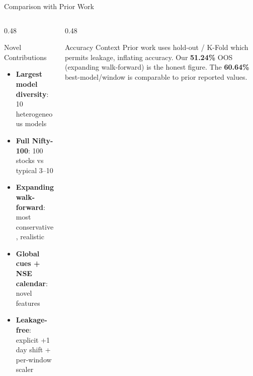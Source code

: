 \documentclass[aspectratio=43,11pt]{beamer}
\begin{document}
\begin{frame}[shrink=10]{Comparison with Prior Work}
    \begin{center}
    \end{center}
    \vspace{0.05cm}
    \begin{columns}[T]
        \begin{column}{0.48\textwidth}
            \begin{exampleblock}{Novel Contributions}
                \footnotesize\setlength{\itemsep}{2pt}
                \begin{itemize}
                    \item \textbf{Largest model diversity}: 10 heterogeneous models
                    \item \textbf{Full Nifty-100}: 100 stocks vs typical 3--10
                    \item \textbf{Expanding walk-forward}: most conservative, realistic
                    \item \textbf{Global cues + NSE calendar}: novel features
                    \item \textbf{Leakage-free}: explicit +1 day shift + per-window scaler
                \end{itemize}
            \end{exampleblock}
        \end{column}
        \begin{column}{0.48\textwidth}
            \begin{alertblock}{Accuracy Context}
                \footnotesize Prior work uses hold-out / K-Fold which permits leakage, inflating accuracy. Our \textbf{51.24\%} OOS (expanding walk-forward) is the honest figure. The \textbf{60.64\%} best-model/window is comparable to prior reported values.
            \end{alertblock}
        \end{column}
    \end{columns}
\end{frame}
\end{document}

